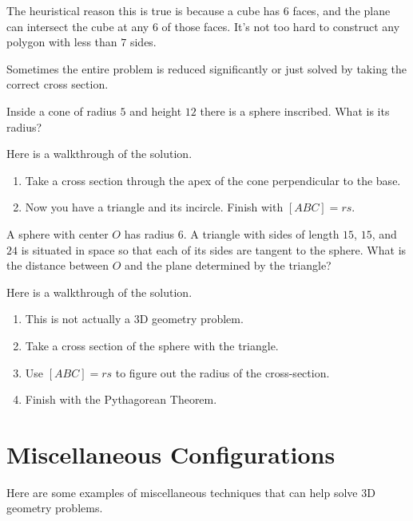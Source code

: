 The heuristical reason this is true is because a cube has $6$ faces, and the plane can intersect the cube at any $6$ of those faces. It's not too hard to construct any polygon with less than $7$ sides.

Sometimes the entire problem is reduced significantly or just solved by taking the correct cross section.

\begin{exam}
Inside a cone of radius $5$ and height $12$ there is a sphere inscribed. What is its radius?
\end{exam}
\begin{sol}
Here is a walkthrough of the solution.
\begin{enumerate}
    \item Take a cross section through the apex of the cone perpendicular to the base.
    
    \item Now you have a triangle and its incircle. Finish with $[ABC]=rs.$
\end{enumerate}
\end{sol}

\begin{exam}[AMC 10A 2019/21]
A sphere with center $O$ has radius 6. A triangle with sides of length $15$, $15$, and $24$ is situated in space so that each of its sides are tangent to the sphere. What is the distance between $O$ and the plane determined by the triangle?
\end{exam}
\begin{sol}
Here is a walkthrough of the solution.
\begin{enumerate}
    \item This is not actually a 3D geometry problem.

    \item Take a cross section of the sphere with the triangle.
    
    \item Use $[ABC]=rs$ to figure out the radius of the cross-section.
    
    \item Finish with the Pythagorean Theorem.
\end{enumerate}
\end{sol}

\section{Miscellaneous Configurations}
Here are some examples of miscellaneous techniques that can help solve 3D geometry problems.


